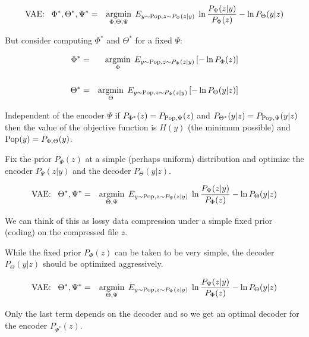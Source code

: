 {

{\huge
\begin{eqnarray*}
\mbox{VAE:}\;\;\;\Phi^*,\Theta^*,\Psi^* &  = & \operatorname*{argmin}_{\Phi,\Theta,\Psi}\;E_{y\sim \mathrm{Pop},z\sim P_\Psi(z|y)}  \;\ln \frac{P_\Psi(z|y)}{P_\Phi(z)}  - \ln P_\Theta(y|z)
\end{eqnarray*}

But consider computing $\Phi^*$ and $\Theta^*$ for a fixed $\Psi$:

\begin{eqnarray*}
\Phi^* & = & \operatorname*{argmin}_\Phi\;E_{y \sim \mathrm{Pop},z \sim P_\Psi(z|y)}\left[ -\ln P_\Phi(z)\right] \\
\\
\Theta^* & = & \operatorname*{argmin}  _\Theta\; E_{y \sim \mathrm{Pop},z \sim P_\Psi(z|y)}\left[-\ln P_\Theta(y|z)\right]
\end{eqnarray*}

\vfill
{\color{red} Independent of the encoder $\Psi$} if $P_{\Phi^*}(z) = P_{\mathrm{Pop},\Psi}(z)$ and $P_{\Theta^*}(y|z) = P_{\mathrm{Pop},\Psi}(y|z)$ then the value of the objective function
is $H(y)$ (the minimum possible) and $\mathrm{Pop}(y) = P_{\Phi,\Theta}(y)$.

}


Fix the prior $P_\Phi(z)$ at a simple (perhaps uniform) distribution and optimize the encoder $P_\Psi(z|y)$ and the decoder $P_\Theta(y|z)$.

{\huge
\begin{eqnarray*}
\mbox{VAE:}\;\;\;\Theta^*,\Psi^* &  = & \operatorname*{argmin}_{\Theta,\Psi}\;E_{y\sim \mathrm{Pop},z\sim P_\Psi(z|y)}  \;\ln \frac{P_\Psi(z|y)}{P_\Phi(z)}  - \ln P_\Theta(y|z)
\end{eqnarray*}
}

We can think of this as lossy data compression under a simple fixed prior (coding) on the compressed file $z$.

\vfill
While the fixed prior $P_\Phi(z)$ can be taken to be very simple, the decoder $P_\Theta(y|z)$ should be optimized aggressively.


{\huge
\begin{eqnarray*}
\mbox{VAE:}\;\;\;\Theta^*,\Psi^* &  = & \operatorname*{argmin}_{\Theta,\Psi}\;E_{y\sim \mathrm{Pop},z\sim P_\Psi(z|y)}  \;\ln \frac{P_\Psi(z|y)}{P_\Phi(z)}  - \ln P_\Theta(y|z)
\end{eqnarray*}
}

\vfill
{\huge
Only the last term depends on the decoder and so we get an optimal decoder for the encoder $P_{\Psi^*}(z)$.

}}
